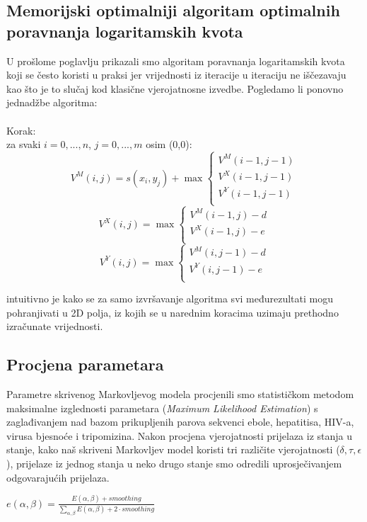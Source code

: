 \documentclass[a4paper]{article}
\newcommand\tab[1][1cm]{\hspace*{#1}}
\begin{document}
\subsection{Memorijski optimalniji algoritam optimalnih poravnanja logaritamskih kvota}
U prošlome poglavlju prikazali smo algoritam poravnanja logaritamskih kvota koji se često koristi u praksi jer vrijednosti iz iteracije u iteraciju ne iščezavaju kao što je to slučaj kod klasične vjerojatnosne izvedbe. Pogledamo li ponovno jednadžbe algoritma:\\\\
Korak:\\
\tab za svaki $i=0,...,n$, $j=0,...,m$ osim (0,0):\\
\begin{equation*}
     V^M(i,j) = s(x_i,y_j) + \max
    \begin{cases}
      V^M(i-1,j-1)\\
      V^X(i-1,j-1)\\
      V^Y(i-1,j-1)\\          
    \end{cases}
\end{equation*}
\begin{equation*}
     V^X(i,j) = \max
    \begin{cases}
      V^M(i-1,j) - d\\
      V^X(i-1,j) - e\\
    \end{cases}   
\end{equation*}
\begin{equation*}
     V^Y(i,j) = \max
    \begin{cases}
      V^M(i,j-1) -d\\
      V^Y(i,j-1) - e\\         
    \end{cases}
\end{equation*}

intuitivno je kako se za samo izvršavanje algoritma svi međurezultati mogu pohranjivati u 2D polja, iz kojih se u narednim koracima uzimaju prethodno izračunate vrijednosti.  


\subsection{Procjena parametara}
Parametre skrivenog Markovljevog modela procjenili smo statističkom metodom  maksimalne izglednosti parametara (\textit{Maximum Likelihood Estimation}) s zaglađivanjem nad bazom prikupljenih parova sekvenci ebole, hepatitisa, HIV-a, virusa bjesnoće i  tripomizina. Nakon procjena vjerojatnosti prijelaza iz stanja u stanje, kako naš skriveni Markovljev model koristi tri različite vjerojatnosti ($\delta, \tau , \epsilon$), prijelaze iz jednog stanja u neko drugo stanje smo odredili uprosječivanjem odgovarajućih prijelaza.\\
\begin{center}
$e(\alpha, \beta) = \frac{E(\alpha, \beta) + smoothing}{\sum_{\alpha, \beta} E(\alpha, \beta)  + 2\cdot smoothing}$
\end{center}
\end{document}

